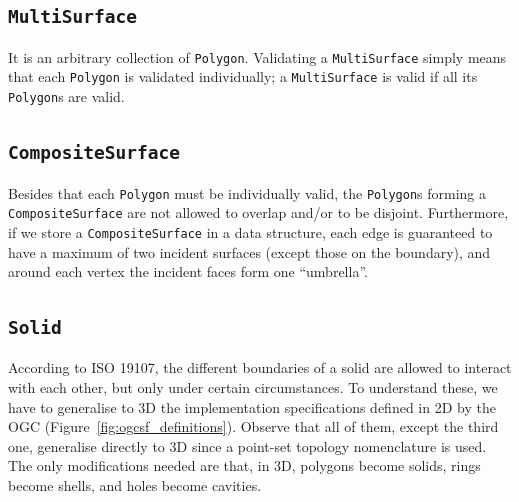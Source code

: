 \subsection{\texttt{MultiSurface}}
It is an arbitrary collection of \texttt{Polygon}.
Validating a \texttt{MultiSurface} simply means that each \texttt{Polygon} is validated individually; a \texttt{MultiSurface} is valid if all its \texttt{Polygon}s are valid.


\subsection{\texttt{CompositeSurface}}
Besides that each \texttt{Polygon} must be individually valid, the \texttt{Polygon}s forming a \texttt{Composite\-Surface} are not allowed to overlap and/or to be disjoint.
Furthermore, if we store a \texttt{Com\-po\-site\-Surface} in a data structure, each edge is guaranteed to have a maximum of two incident surfaces (except those on the boundary), and around each vertex the incident faces form one ``umbrella''.


\subsection{\texttt{Solid}}

According to ISO 19107, the different boundaries of a solid are allowed to interact with each other, but only under certain circumstances.
To understand these, we have to generalise to 3D the implementation specifications defined in 2D by the OGC (Figure~\ref{fig:ogcsf_definitions}).
Observe that all of them, except the third one, generalise directly to 3D since a point-set topology nomenclature is used.
The only modifications needed are that, in 3D, polygons become solids, rings become shells, and holes become cavities.

